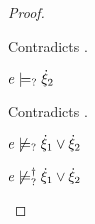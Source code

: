 \begin{proof}
\begin{byCases}
\begin{byCases}
\begin{byCases}
\begin{pfsteps*}
            \end{pfsteps*}
            Contradicts .
        \item[\text{(\ref{rule:CMSOr2})}]
            \begin{pfsteps*}
            \item $e \models_{?} \dot{\xi}_2$ 
            \end{pfsteps*}
            Contradicts .
        \end{byCases}
        \begin{pfsteps*}
        \item $e \not\models_{?} \dot{\xi}_1 \vee \dot{\xi}_2$  
        \item $e \not\models_{?}^{\dag} \dot{\xi}_1 \vee \dot{\xi}_2$ 
        \end{pfsteps*}
        

\end{byCases}
\end{byCases}
\end{proof}
